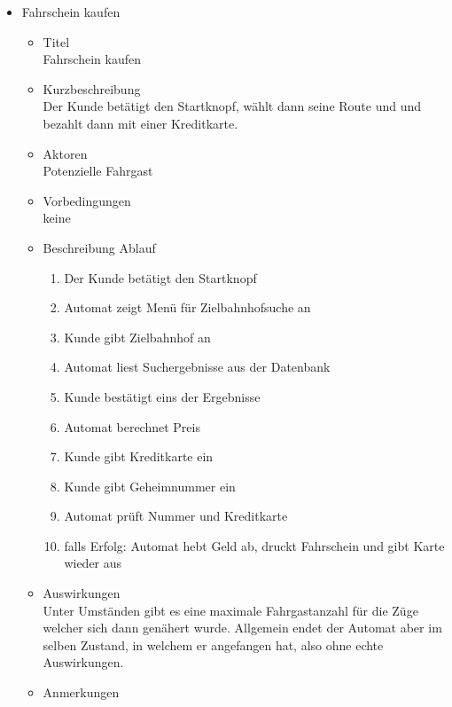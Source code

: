 \documentclass[11pt]{article}
\begin{document}
\begin{itemize}

\item Fahrschein kaufen
\label{sec-2-3-1-1}%
\begin{itemize}

\item Titel\\
\label{sec-2-3-1-1-1}%
Fahrschein kaufen

\item Kurzbeschreibung\\
\label{sec-2-3-1-1-2}%
Der Kunde betätigt den Startknopf, wählt dann seine Route und
      und bezahlt dann mit einer Kreditkarte.

\item Aktoren\\
\label{sec-2-3-1-1-3}%
Potenzielle Fahrgast

\item Vorbedingungen\\
\label{sec-2-3-1-1-4}%
keine

\item Beschreibung Ablauf
\label{sec-2-3-1-1-5}%
\begin{enumerate}
\item Der Kunde betätigt den Startknopf
\item Automat zeigt Menü für Zielbahnhofsuche an
\item Kunde gibt Zielbahnhof an
\item Automat liest Suchergebnisse aus der Datenbank
\item Kunde bestätigt eins der Ergebnisse
\item Automat berechnet Preis
\item Kunde gibt Kreditkarte ein
\item Kunde gibt Geheimnummer ein
\item Automat prüft Nummer und Kreditkarte
\item falls Erfolg: Automat hebt Geld ab, druckt Fahrschein und
          gibt Karte wieder aus
\end{enumerate}

\item Auswirkungen\\
\label{sec-2-3-1-1-6}%
Unter Umständen gibt es eine maximale Fahrgastanzahl für die
      Züge welcher sich dann genähert wurde. Allgemein endet der
      Automat aber im selben Zustand, in welchem er angefangen hat,
      also ohne echte Auswirkungen.

\item Anmerkungen
\label{sec-2-3-1-1-7}%
\end{itemize} %


\end{itemize}
\end{document}
